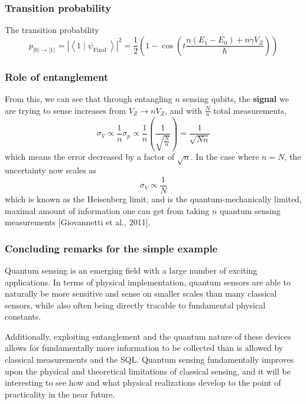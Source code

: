 \documentclass{beamer}
\begin{document}
\begin{frame}
\frametitle{Transition probability}

The transition probability
\[
p_{|0\rangle \rightarrow|1\rangle}=\left|\left\langle 1 \mid \psi_{\text {Final }}\right\rangle\right|^{2}=\frac{1}{2}\left(1-\cos \left(t \frac{n\left(E_{1}-E_{0}\right)+n \gamma V_Z}{\hbar}\right)\right)
\]
\end{frame}

\begin{frame}
\frametitle{Role of entanglement}

From this, we can see that through entangling $n$ sensing qubits, the
\textbf{signal} we are trying to sense increases from $V_Z \rightarrow n
V_Z$, and with $\frac{N}{n}$ total measurements,
\[
\sigma_{V} \propto \frac{1}{n} \sigma_{p} \propto \frac{1}{n}\left(\frac{1}{\sqrt{\frac{N}{n}}}\right)=\frac{1}{\sqrt{N n}}
\]
which means the error decreased by a factor of $\sqrt{n}$. In the case where $n=N$, the uncertainty now scales as
\[
\sigma_{V} \propto \frac{1}{N}
\]
which is known as the Heisenberg limit, and is the
quantum-mechanically limited, maximal amount of information one can
get from taking $n$ quantum sensing measurements [Giovannetti et al.,
2011].
\end{frame}

\begin{frame}
\frametitle{Concluding remarks for the simple example}

Quantum sensing is an emerging field with a large number of exciting
applications. In terms of physical implementation, quantum sensors are
able to naturally be more sensitive and sense on smaller scales than
many classical sensors, while also often being directly tracable to
fundamental physical constants.

Additionally, exploiting entanglement and the quantum nature of these
devices allows for fundamentally more information to be collected than
is allowed by classical measurements and the SQL. Quantum sensing
fundamentally improves upon the physical and theoretical limitations
of classical sensing, and it will be interesting to see how and what
physical realizations develop to the point of practicality in the near
future.
\end{frame}
\end{document}
